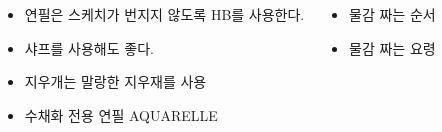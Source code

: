 \documentclass[	20pt, 
							a0paper, 
							landscape, %
							margin=0mm, %
							innermargin=4mm,  		%
							blockverticalspace=4mm, %
							colspace=5mm, 
							subcolspace=0mm
							]{tikzposter}
\begin{document}
\begin{columns}
{			\begin{LARGE}
			\begin{itemize}
			\item 연필은 스케치가 번지지 않도록 HB를 사용한다. 
			\item 샤프를 사용해도 좋다.
			\item 지우개는 말랑한 지우재를  사용
			\item 수채화 전용 연필 AQUARELLE
			\end{itemize}
			\end{LARGE}
		}


		{
			\setlength{\leftmargini}{2em}			
			\setlength{\labelsep}{1em} %

			\begin{LARGE}
			\begin{itemize}
			\item 물감 짜는 순서
			\item 물감 짜는 요령
			\end{itemize}
			\end{LARGE}
		}















\end{columns}
\end{document}
